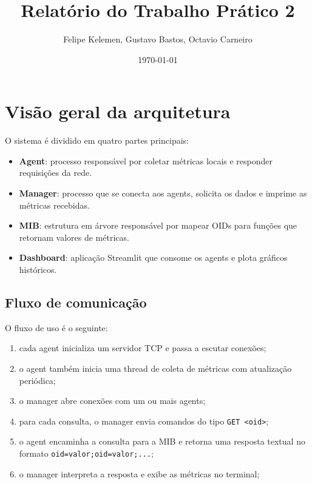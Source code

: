 \documentclass[12pt,a4paper]{article}
\title{Relatório do Trabalho Prático 2}
\author{Felipe Kelemen, Gustavo Bastos, Octavio Carneiro}
\date{\today}
\begin{document}
\maketitle


\section{Visão geral da arquitetura}
O sistema é dividido em quatro partes principais:
\begin{itemize}
	\item \textbf{Agent}: processo responsável por coletar métricas locais e responder requisições da rede.
	\item \textbf{Manager}: processo que se conecta aos agents, solicita os dados e imprime as métricas recebidas.
	\item \textbf{MIB}: estrutura em árvore responsável por mapear OIDs para funções que retornam valores de métricas.
	\item \textbf{Dashboard}: aplicação Streamlit que consome os agents e plota gráficos históricos.
\end{itemize}

\subsection{Fluxo de comunicação}
O fluxo de uso é o seguinte:
\begin{enumerate}
	\item cada agent inicializa um servidor TCP e passa a escutar conexões;
	\item o agent também inicia uma thread de coleta de métricas com atualização periódica;
	\item o manager abre conexões com um ou mais agents;
	\item para cada consulta, o manager envia comandos do tipo \texttt{GET <oid>};
	\item o agent encaminha a consulta para a MIB e retorna uma resposta textual no formato \texttt{oid=valor;oid=valor;...};
	\item o manager interpreta a resposta e exibe as métricas no terminal;
\end{enumerate}
\end{document}
